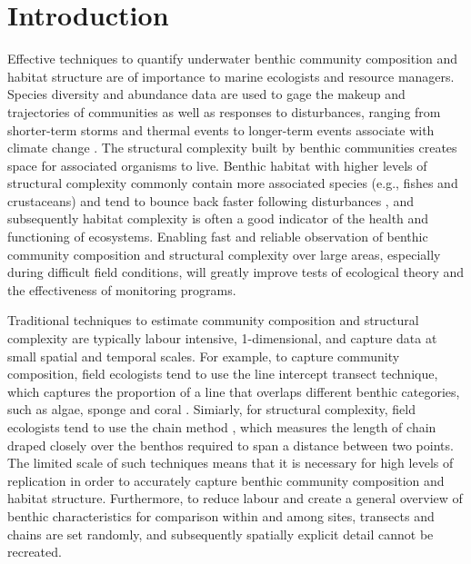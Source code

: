 \section{Introduction} 


Effective techniques to quantify underwater benthic community composition and habitat structure are of importance to marine ecologists and resource managers. Species diversity and abundance data are used to gage the makeup and trajectories of communities as well as responses to disturbances, ranging from shorter-term storms and thermal events \cite{De_ath_2012} to longer-term events associate with climate change \cite{Hughes_2003}. The structural complexity built by benthic communities creates space for associated organisms to live. Benthic habitat with higher levels of structural complexity commonly contain more associated species (e.g., fishes and crustaceans) \cite{Graham_2012} and tend to bounce back faster following disturbances \cite{Graham_2015}, and subsequently habitat complexity is often a good indicator of the health and functioning of ecosystems. Enabling fast and reliable observation of benthic community composition and structural complexity over large areas, especially during difficult field conditions, will greatly improve tests of ecological theory and the effectiveness of monitoring programs.

\newline


Traditional techniques to estimate community composition and structural complexity are typically labour intensive, 1-dimensional, and capture data at small spatial and temporal scales. For example, to capture community composition, field ecologists tend to use the line intercept transect technique, which captures the proportion of a line that overlaps different benthic categories, such as algae, sponge and coral  \cite{Loya_1972}. Simiarly, for structural complexity, field ecologists tend to use the chain method \cite{Luckhurst_1978} \cite{Friedlander_1998}, which measures the length of chain draped closely over the benthos required to span a distance between two points. The limited scale of such techniques means that it is necessary for high levels of replication in order to accurately capture benthic community composition and habitat structure. Furthermore, to reduce labour and create a general overview of benthic characteristics for comparison within and among sites, transects and chains are set randomly, and subsequently spatially explicit detail cannot be recreated. 

